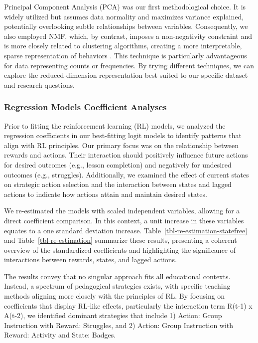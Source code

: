 \documentclass[
  number,
  preprint,
  3p,
  onecolumn]{elsarticle}
\begin{document}
Principal Component Analysis (PCA) was our first methodological choice.
It is widely utilized but assumes data normality \citep{jolliffe2016}
and maximizes variance explained, potentially overlooking subtle
relationships between variables. Consequently, we also employed NMF,
which, by contrast, imposes a non-negativity constraint and is more
closely related to clustering algorithms, creating a more interpretable,
sparse representation of behaviors \citep{ding2005, lee1999}. This
technique is particularly advantageous for data representing counts or
frequencies. By trying different techniques, we can explore the
reduced-dimension representation best suited to our specific dataset and
research questions.

\subsubsection{Regression Models Coefficient
Analyses}\label{regression-models-coefficient-analyses}

Prior to fitting the reinforcement learning (RL) models, we analyzed the
regression coefficients in our best-fitting logit models to identify
patterns that align with RL principles. Our primary focus was on the
relationship between rewards and actions. Their interaction should
positively influence future actions for desired outcomes (e.g., lesson
completion) and negatively for undesired outcomes (e.g., struggles).
Additionally, we examined the effect of current states on strategic
action selection and the interaction between states and lagged actions
to indicate how actions attain and maintain desired states.

We re-estimated the models with scaled independent variables, allowing
for a direct coefficient comparison. In this context, a unit increase in
these variables equates to a one standard deviation increase.
Table~\ref{tbl-re-estimation-statefree} and
Table~\ref{tbl-re-estimation} summarize these results, presenting a
coherent overview of the standardized coefficients and highlighting the
significance of interactions between rewards, states, and lagged
actions.

The results convey that no singular approach fits all educational
contexts. Instead, a spectrum of pedagogical strategies exists, with
specific teaching methods aligning more closely with the principles of
RL. By focusing on coefficients that display RL-like effects,
particularly the interaction term R(t-1) x A(t-2), we identified
dominant strategies that include 1) Action: Group Instruction with
Reward: Struggles, and 2) Action: Group Instruction with Reward:
Activity and State: Badges.
\end{document}
